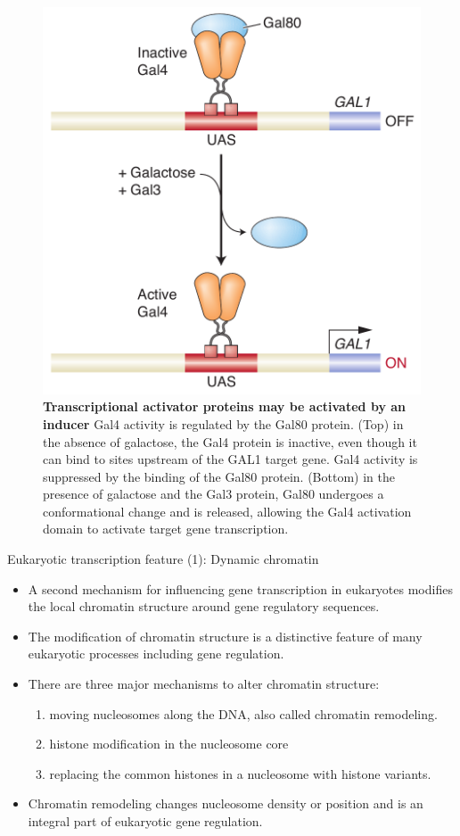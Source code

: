 \documentclass[11pt,dvipsnames,ignorenonframetext,aspectratio=169]{beamer}
\providecommand{\tightlist}{%
  \setlength{\itemsep}{0pt}\setlength{\parskip}{0pt}}
\begin{document}
\begin{frame}{}
\protect\hypertarget{section-18}{}

\begin{figure}
\includegraphics[width=0.4\linewidth]{../images/transcriptional_activator_proteins_inducer} \caption{\textbf{Transcriptional activator proteins may be activated by an inducer} \newline Gal4 activity is regulated by the Gal80 protein. (Top) in the absence of galactose, the Gal4 protein is inactive, even though it can bind to sites upstream of the GAL1 target gene. Gal4 activity is suppressed by the binding of the Gal80 protein. (Bottom) in the presence of galactose and the Gal3 protein, Gal80 undergoes a conformational change and is released, allowing the Gal4 activation domain to activate target gene transcription.}\label{fig:inducer-proteins}
\end{figure}

\end{frame}

\begin{frame}{Eukaryotic transcription feature (1): Dynamic chromatin}
\protect\hypertarget{eukaryotic-transcription-feature-1-dynamic-chromatin}{}

\begin{itemize}
\tightlist
\item
  A second mechanism for influencing gene transcription in eukaryotes
  modifies the local chromatin structure around gene regulatory
  sequences.
\item
  The modification of chromatin structure is a distinctive feature of
  many eukaryotic processes including gene regulation.
\item
  There are three major mechanisms to alter chromatin structure:

  \begin{enumerate}
  \tightlist
  \item
    moving nucleosomes along the DNA, also called chromatin remodeling.
  \item
    histone modification in the nucleosome core
  \item
    replacing the common histones in a nucleosome with histone variants.
  \end{enumerate}
\item
  Chromatin remodeling changes nucleosome density or position and is an
  integral part of eukaryotic gene regulation.
\end{itemize}

\end{frame}
\end{document}
